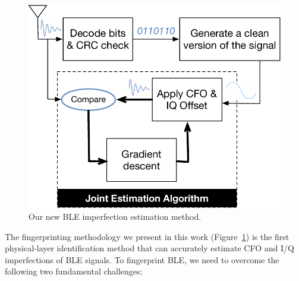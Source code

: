 \begin{figure}
    \centering
    \includegraphics[width = 0.75\linewidth]{bletracking/plots/jointestimation.pdf} 
    \caption{Our new BLE imperfection estimation method.}
    \label{fig:overview}
\end{figure}

The fingerprinting methodology we present in this work (Figure~\ref{fig:overview}) is the first
physical-layer identification method that can accurately estimate CFO and I/Q
imperfections of BLE signals. To fingerprint BLE, we need to overcome the following two fundamental
challenges:

